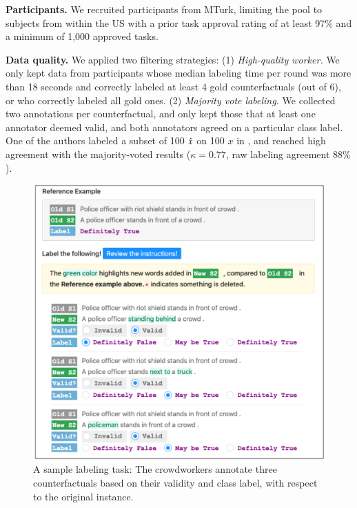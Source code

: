 \textbf{Participants.}
We recruited participants from MTurk, limiting the pool to subjects from within the US with a prior task approval rating of at least 97\% and a minimum of 1,000 approved tasks.

\textbf{Data quality.}
We applied two filtering strategies: 
(1) \emph{High-quality worker.} 
We only kept data from participants whose median labeling time per round was more than 18 seconds and correctly labeled at least 4 gold counterfactuals (out of 6), or who correctly labeled all gold ones.
(2) \emph{Majority vote labeling.}
We collected two annotations per counterfactual, and only kept those that at least one annotator deemed valid, and both annotators agreed on a particular class label.
One of the authors labeled a subset of 100 $\hat{x}$ on 100 $x$ in \sst, and reached high agreement with the majority-voted results ($\kappa=0.77$, raw labeling agreement $88\%$).


\begin{figure}
\centering
\includegraphics[width=0.9\columnwidth]{figures/mturk_label}
\vspace{-5pt}
\caption{A sample labeling task: The crowdworkers annotate three counterfactuals based on their validity and class label, with respect to the original instance.}
\vspace{-15pt}
\label{fig:mturk_ui}
\end{figure}

